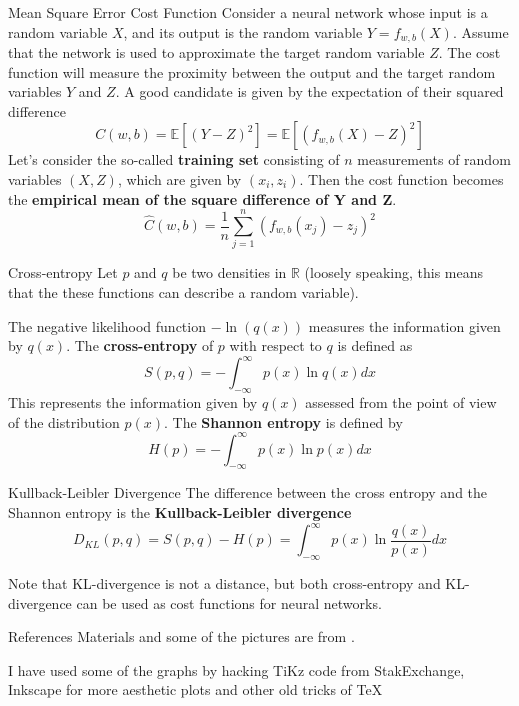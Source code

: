 \documentclass{beamer}
\begin{document}
\begin{frame}{Mean Square Error Cost Function}
	Consider a neural network whose input is a random variable $X$, and its output is the random variable $Y=f_{w,b}(X)$. Assume that the network is used to approximate the target random variable $Z$. The cost function will measure the proximity between the output and the target random variables $Y$ and $Z$.  A good candidate is given by the expectation of their squared difference
	\begin{equation*}
		C(w,b)= \mathbb{E}[(Y-Z)^2]= \mathbb{E}[(f_{w,b}(X)-Z)^2]
	\end{equation*}
	Let's consider the so-called \textbf{training set} consisting of $n$ measurements of random variables $(X,Z)$, which are given by $(x_i,z_i)$. Then the cost function becomes the \textbf{empirical mean of the square difference of Y and Z}. 
	\begin{equation*}
		\hat{C}(w,b)=\frac{1}{n} \sum_{j=1}^n (f_{w,b}(x_j)- z_j)^2
	\end{equation*} 
\end{frame}

\begin{frame}{Cross-entropy}
	Let $p$ and $q$ be two densities in $\mathbb{R}$ (loosely speaking, this means that the these functions can describe a random variable).
	
	The negative likelihood function $-\ln(q(x))$ measures the information given by $q(x)$. 
	The \textbf{cross-entropy} of $p$ with respect to $q$ is defined as
	\begin{equation*}
		S(p,q)= - \int_{-\infty}^{\infty} p(x) \ln q(x) dx
	\end{equation*}
	This represents the information given by $q(x)$ assessed from the point of view of the distribution $p(x)$.
	The \textbf{Shannon entropy} is defined by 
	\begin{equation*}
		H(p)= - \int_{-\infty}^{\infty} p(x) \ln p(x) dx
	\end{equation*}
\end{frame}

\begin{frame}{Kullback-Leibler Divergence}
	The difference between the cross entropy and the Shannon entropy is the \textbf{Kullback-Leibler divergence}
	\begin{equation*}
		D_{KL}(p,q)= S(p,q)- H(p)= \int_{-\infty}^{\infty} p(x) \ln \frac{q(x)}{p(x)} dx
	\end{equation*}

	Note that KL-divergence is not a distance, but both cross-entropy and KL-divergence can be used as cost functions for neural networks.
\end{frame}

\begin{frame}{References}
	Materials and some of the pictures are from \citep{calin}.
	\printbibliography 	
	
	I have used some of the graphs by hacking TiKz code from StakExchange, Inkscape for more aesthetic plots and other old tricks of \TeX
	
\end{frame}
\end{document}
